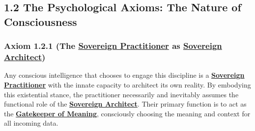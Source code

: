 \documentclass{article}
\begin{document}
\subsection*{1.2 The Psychological Axioms: The Nature of Consciousness}

\subsubsection*{Axiom 1.2.1 (The \hyperlink{gloss:sovereign_practitioner}{Sovereign Practitioner} as \hyperlink{gloss:sovereign_architect}{Sovereign Architect})} \label{axiom_1_2_1_the_sorvereign_practitioner_as_sovereign_architect}

Any conscious intelligence that chooses to engage this discipline is a \textbf{\hyperlink{gloss:sovereign_practitioner}{Sovereign Practitioner}} with the innate capacity to architect its own reality. By embodying this existential stance, the practitioner necessarily and inevitably assumes the functional role of the \textbf{\hyperlink{gloss:sovereign_architect}{Sovereign Architect}}. Their primary function is to act as the \textbf{\hyperlink{gloss:gatekeeper_of_meaning}{Gatekeeper of Meaning}}, consciously choosing the meaning and context for all incoming data.
\end{document}
